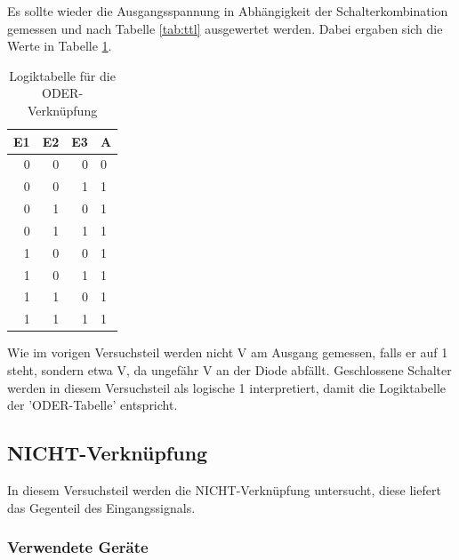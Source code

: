 \documentclass[12pt,a4paper]{article}
\begin{document}
Es sollte wieder die Ausgangsspannung in Abhängigkeit der Schalterkombination gemessen und nach Tabelle \ref{tab:ttl} ausgewertet werden. Dabei ergaben sich die Werte in Tabelle \ref{tab:1_2}.

\begin{table}[H]
\begin{center}
\begin{tabular}{r|r|r|l}

\multicolumn{1}{l|}{E1} & \multicolumn{1}{l|}{E2} & \multicolumn{1}{l|}{E3} & A \\ \hline \hline
0 & 0 & 0 & 0 \\ 
0 & 0 & 1 & 1 \\ 
0 & 1 & 0 & 1 \\ 
0 & 1 & 1 & 1 \\ 
1 & 0 & 0 & 1 \\ 
1 & 0 & 1 & 1 \\ 
1 & 1 & 0 & 1 \\ 
1 & 1 & 1 & 1 \\ 
\end{tabular}
\end{center}
\caption{Logiktabelle für die ODER-Verknüpfung}
\label{tab:1_2}
\end{table}

Wie im vorigen Versuchsteil werden nicht \unit[5]{V} am Ausgang gemessen, falls er auf 1 steht, sondern etwa \unit[4,3]{V}, da ungefähr \unit[0,7]{V} an der Diode abfällt.
Geschlossene Schalter werden in diesem Versuchsteil als logische 1 interpretiert, damit die Logiktabelle der 'ODER-Tabelle' entspricht.

\subsection{NICHT-Verknüpfung}

In diesem Versuchsteil werden die NICHT-Verknüpfung untersucht, diese liefert das Gegenteil des Eingangssignals.

\subsubsection*{Verwendete Geräte}
\end{document}
